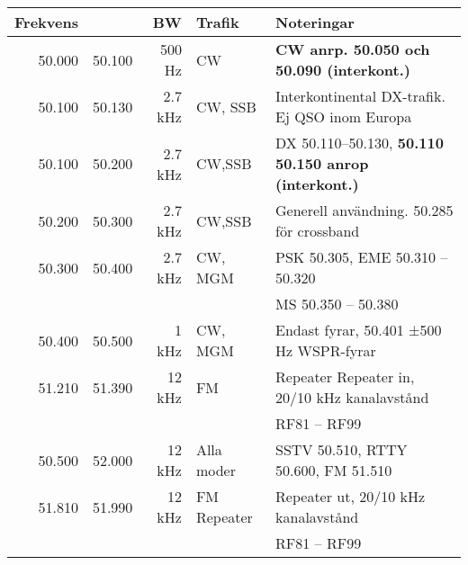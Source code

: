 \begin{tabular}{rrrll}

\textbf{Frekvens} &  & \textbf{BW} & \textbf{Trafik} & \textbf{Noteringar} \\ \hline

50.000 & 50.100 & 500 Hz  & CW          & \textbf{CW anrp. 50.050 och 50.090 (interkont.)}             \\ \hline
50.100 & 50.130 & 2.7 kHz & CW, SSB     & Interkontinental DX-trafik. Ej QSO inom Europa               \\ \hline
50.100 & 50.200 & 2.7 kHz & CW,SSB      & DX 50.110--50.130, \textbf{50.110 50.150 anrop (interkont.)} \\ \hline
50.200 & 50.300 & 2.7 kHz & CW,SSB      & Generell användning. 50.285 för crossband                    \\ \hline
50.300 & 50.400 & 2.7 kHz & CW, MGM     & PSK 50.305, EME 50.310 – 50.320                              \\
       &        &         &             & MS 50.350 – 50.380                                           \\ \hline
50.400 & 50.500 & 1 kHz   & CW, MGM     & Endast fyrar, 50.401 ±500 Hz WSPR-fyrar                      \\ \hline
51.210 & 51.390 & 12 kHz  & FM          & Repeater Repeater in, 20/10 kHz kanalavstånd                 \\
       &        &         &             & RF81 – RF99                                                  \\ \hline
50.500 & 52.000 & 12 kHz  & Alla moder  & SSTV 50.510, RTTY 50.600, FM 51.510                          \\ \hline
51.810 & 51.990 & 12 kHz  & FM Repeater & Repeater ut, 20/10 kHz kanalavstånd                          \\
       &        &         &             & RF81 – RF99                                                  \\ \hline
\end{tabular}

